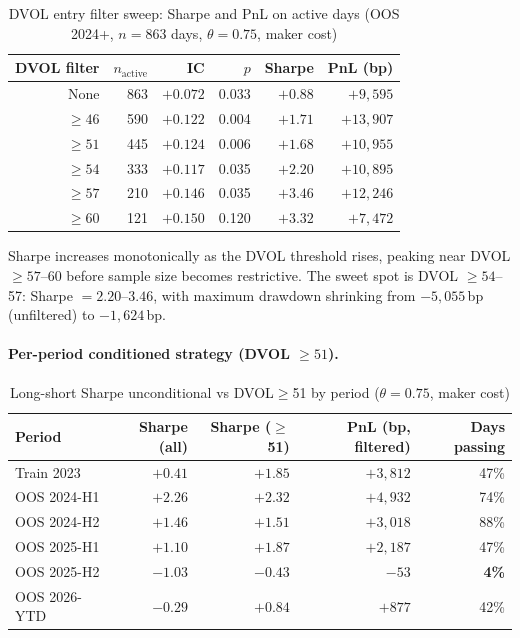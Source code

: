 \documentclass[12pt, a4paper]{article}
\theoremstyle{definition}
\begin{document}
\begin{table}[ht]
\centering
\caption{DVOL entry filter sweep: Sharpe and PnL on active days (OOS 2024+, $n=863$ days, $\theta=0.75$, maker cost)}
\label{tab:dvol_sweep}
\begin{tabular}{rrrrrr}
\toprule
DVOL filter & $n_{\text{active}}$ & IC & $p$ & Sharpe & PnL (bp) \\
\midrule
None        & 863 & $+0.072$ & 0.033 & $+0.88$ & $+9{,}595$  \\
$\geq 46$   & 590 & $+0.122$ & 0.004 & $+1.71$ & $+13{,}907$ \\
$\geq 51$   & 445 & $+0.124$ & 0.006 & $+1.68$ & $+10{,}955$ \\
$\geq 54$   & 333 & $+0.117$ & 0.035 & $+2.20$ & $+10{,}895$ \\
$\geq 57$   & 210 & $+0.146$ & 0.035 & $+\mathbf{3.46}$ & $+12{,}246$ \\
$\geq 60$   & 121 & $+0.150$ & 0.120 & $+3.32$ & $+7{,}472$  \\
\bottomrule
\end{tabular}
\end{table}

Sharpe increases monotonically as the DVOL threshold rises, peaking near
DVOL $\geq 57$--60 before sample size becomes restrictive.  The sweet spot
is DVOL $\geq 54$--57: Sharpe $= 2.20$--$3.46$, with maximum drawdown
shrinking from $-5{,}055$\,bp (unfiltered) to $-1{,}624$\,bp.

\paragraph{Per-period conditioned strategy (DVOL $\geq 51$).}

\begin{table}[ht]
\centering
\caption{Long-short Sharpe unconditional vs DVOL$\geq$51 by period ($\theta=0.75$, maker cost)}
\label{tab:dvol_cond}
\begin{tabular}{lrrrr}
\toprule
Period & Sharpe (all) & Sharpe ($\geq$51) & PnL (bp, filtered) & Days passing \\
\midrule
Train 2023   & $+0.41$ & $+1.85$ & $+3{,}812$ & 47\% \\
OOS 2024-H1  & $+2.26$ & $+2.32$ & $+4{,}932$ & 74\% \\
OOS 2024-H2  & $+1.46$ & $+1.51$ & $+3{,}018$ & 88\% \\
OOS 2025-H1  & $+1.10$ & $+1.87$ & $+2{,}187$ & 47\% \\
OOS 2025-H2  & $-1.03$ & $-0.43$ & $-53$       & \textbf{4\%} \\
OOS 2026-YTD & $-0.29$ & $+0.84$ & $+877$      & 42\% \\
\bottomrule
\end{tabular}
\end{table}
\end{document}
